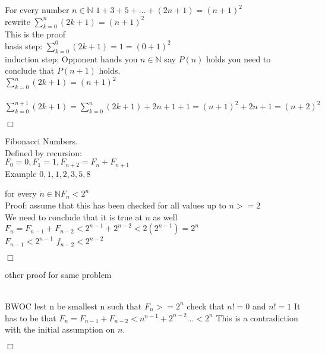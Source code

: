 \documentclass[12pt]{article}
\begin{document}
 For every number $n \in \mathbb{N}$
$1+3+5+\dots+(2n+1) = (n+1)^2$
\\rewrite $\sum_{k=0}^{n} (2k+1) = (n+1)^2$\\

 This is the proof
\\basis step: $\sum_{k=0}^{0}(2k+1) = 1 = (0+1)^2$
\\ induction step: Opponent hands you $n  \in \mathbb{N}$ 
say $P(n)$ holds you need to conclude that $P(n+1)$ holds.\\

$\sum_{k=0}^{n}(2k+1) = (n+1)^2$
\\
\\
$\sum_{k=0}^{n+1}(2k+1)= \sum_{k=0}^{n}(2k+1)+2n+1+1 = (n+1)^2 +2n+1=(n+2)^2$
\begin{flushright}
        $\Box$
\end{flushright}


Fibonacci Numbers.\\
Defined by recursion:\\
$F_0 = 0 ,F_1 = 1,F_{n+2} = F_n +F_{n+1}$\\
Example $0,1,1,2,3,5,8$

 for every $n\in \mathbb{N} F_n < 2^n$
\\ Proof: assume that this has been checked for all values up to $n >= 2$
\\We need to conclude that it is true at $n$ as well\\
$F_n = F_{n-1} +F_{n-2} <2^{n-1}+2^{n-2} <2(2^{n-1}) = 2^n$\\
$F_{n-1} <2^{n-1} $ $f_{n-2} < 2^{n-2} $
\begin{flushright}
        $\Box$
\end{flushright}

other proof for same problem 

\\
BWOC lest n be smallest n such that $F_n >= 2^n$
check that $n != 0$ and $n!= 1$
It has to be that $F_n = F_{n-1}+F_{n-2}<n^{n-1}+2^{n-2}\dots < 2^n$
This is a contradiction with the initial assumption on $n$.
\begin{flushright}
        $\Box$
\end{flushright}
\end{document}
